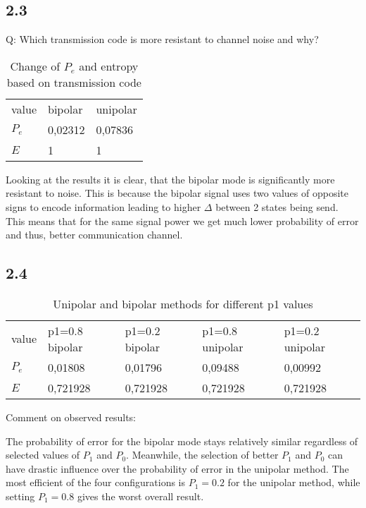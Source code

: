 \documentclass{article}
\begin{document}
\subsection*{2.3}
Q: Which transmission code is more resistant to channel noise and why?   

\begin{table}[ht!]
    \caption{Change of $P_e$ and entropy based on transmission code}
    \label{tab:tab22}
    \begin{center}
        \begin{tabular}[c]{l|l|l}
            value & bipolar & unipolar\\
            $P_e$ & 0,02312 & 0,07836\\
            $E$ & 1 & 1\\
        \end{tabular}
    \end{center}
\end{table}

Looking at the results it is clear, that the bipolar mode is significantly more
resistant to noise. This is because the bipolar signal uses two values of opposite signs
to encode information leading to higher $\Delta$ between 2 states being send. This means 
that for the same signal power we get much lower probability of error and thus, better
communication channel.

\subsection*{2.4} 
\begin{table}[ht!]
    \caption{Unipolar and bipolar methods for different p1 values}
    \label{tab:tab22}
    \begin{center}
        \begin{tabular}[c]{l|l|l|l|l}
            value & p1=0.8 bipolar & p1=0.2 bipolar & p1=0.8 unipolar & p1=0.2 unipolar\\
            $P_e$ & 0,01808 & 0,01796 & 0,09488 & 0,00992\\
            $E$ & 0,721928 & 0,721928 & 0,721928 & 0,721928\\
        \end{tabular}
    \end{center}
\end{table}

Comment on observed results: 

The probability of error for the bipolar mode stays relatively similar
regardless of selected values of $P_1$ and $P_0$. Meanwhile, the selection of better
$P_1$ and $P_0$ can have drastic influence over the probability of error in the
unipolar method. The most efficient of the four configurations is $P_1=0.2$ for
the unipolar method, while setting $P_1=0.8$ gives the worst overall result. 
\end{document}
